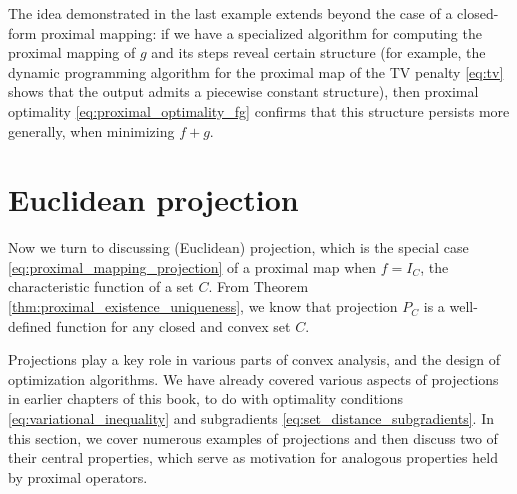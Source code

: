 The idea demonstrated in the last example extends beyond the case of a
closed-form proximal mapping: if we have a specialized algorithm for computing
the proximal mapping of $g$ and its steps reveal certain structure (for
example, the dynamic programming algorithm for the proximal map of the TV
penalty \eqref{eq:tv} shows that the output admits a piecewise constant
structure), then proximal optimality \eqref{eq:proximal_optimality_fg} confirms
that this structure persists more generally, when minimizing $f+g$.

\section{Euclidean projection}

Now we turn to discussing (Euclidean) projection, which is the special case
\eqref{eq:proximal_mapping_projection} of a proximal map when $f = I_C$, the
characteristic function of a set $C$. From Theorem
\ref{thm:proximal_existence_uniqueness}, we know that projection $P_C$ is a 
well-defined function for any closed and convex set $C$. 

Projections play a key role in various parts of convex analysis, and the design
of optimization algorithms. We have already covered various aspects of
projections in earlier chapters of this book, to do with optimality conditions 
\eqref{eq:variational_inequality} and subgradients
\eqref{eq:set_distance_subgradients}. In this section, we cover numerous
examples of projections and then discuss two of their central properties, which 
serve as motivation for analogous properties held by proximal operators.  

